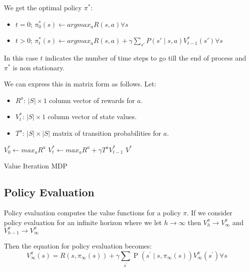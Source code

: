 \documentclass[12pt]{article}
\begin{document}
            We get the optimal policy $\pi^*$:
            \begin{itemize}
                \item $t=0$; $\pi_0^*(s) \gets argmax_a R(s,a) \forall s$
                \item $t>0$; $\pi_t^*(s) \gets argmax_a R(s,a) + \gamma \sum_{s'}P(s' \mid s, a) V_{t-1}^* (s') \forall s$
            \end{itemize}
            
            In this case $t$ indicates the number of time steps to go till the end of process and $\pi^*$ is non
            stationary. 
            
            We can express this in matrix form as follows. Let:
            \begin{itemize}
                \item $R^a$: $|S| \times 1$ column vector of rewards for $a$.
                \item $V_t^*$: $|S| \times 1$ column vector of state values.
                \item $T^a$: $|S| \times |S|$ matrix of transition probabilities for $a$.
            \end{itemize}

            \begin{algorithm}[H]
                \SetAlgoLined
                $V_0^* \gets max_a R^a$\;
                 {
                    $V_t^* \gets max_a R^a + \gamma T^a V_{t-1}^*$
                }
                \Return $V^*$
                \caption{Value Iteration MDP}
            \end{algorithm}

        \subsection{Policy Evaluation}
            Policy evaluation computes the value functions for a policy $\pi$. If we consider policy evaluation for an
            infinite horizon where we let $h \rightarrow \infty$ then $V_h^{\pi} \rightarrow V_{\infty}^{\pi}$ and
            $V_{h-1}^{\pi} \rightarrow V_{\infty}^{\pi}$
            
            Then the equation for policy evaluation becomes:
            $$V_{\infty}^{\pi}(s)=R\left(s, \pi_{\infty}(s)\right)+\gamma \sum_{s^{\prime}} \operatorname{P}\left(s^{\prime} \mid s, \pi_{\infty}(s)\right) V_{\infty}^{\pi}\left(s^{\prime}\right) \forall s$$
\end{document}
